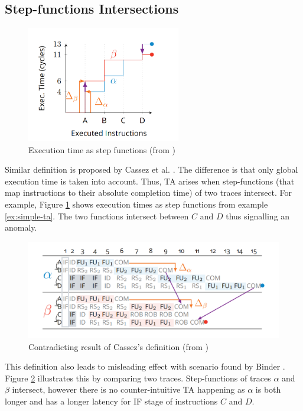 \subsection{Step-functions Intersections}

\begin{figure}[H]
    \centering
    \includegraphics[width=0.6\textwidth]{figures/step-functions.png}
    \caption{Execution time as step functions (from \cite{binder_definitions_2022})}
    \label{fig:exec-time-step-fun}
\end{figure}

Similar definition is proposed by Cassez et al. \cite{cassez_what_2012}. The difference is that only global execution time is taken into account. Thus, TA arises when step-functions (that map instructions to their absolute completion time) of two traces intersect. For example, Figure \ref{fig:exec-time-step-fun} shows execution times as step functions from example \ref{ex:simple-ta}. The two functions intersect between $C$ and $D$ thus signalling an anomaly.

\begin{figure}[!htb]
    \centering
    \includegraphics[width=\textwidth]{figures/step-func-2-bad.png}
    \caption{Contradicting result of Cassez's definition (from \cite{binder_definitions_2022})}
    \label{fig:step-2}
\end{figure}

This definition also leads to misleading effect with scenario found by Binder \cite{binder_definitions_2022}. Figure \ref{fig:step-2} illustrates this by comparing two traces. Step-functions of traces $\alpha$ and $\beta$ intersect, however there is no counter-intuitive TA happening as $\alpha$ is both longer and has a  longer latency for IF stage of instructions $C$ and $D$.

